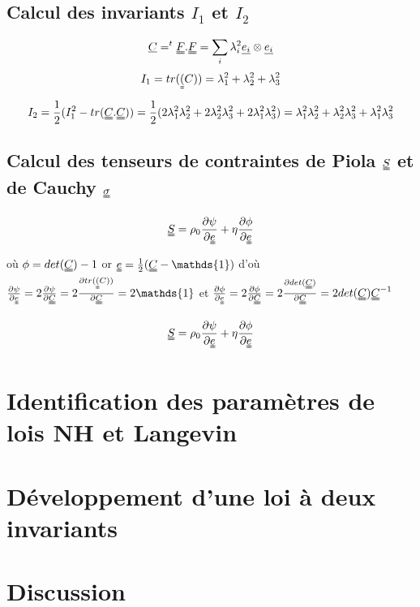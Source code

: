 \documentclass[a4paper,11pt]{article}
\begin{document}
\subsection*{Calcul des invariants $I_1$ et $I_2$}
$$\uline{C}=^t\uuline{F}.\uuline{F}=\sum_{i} \lambda_i ^2\uline{e_i}\otimes \uline{e_i}$$
$$I_1= tr(\uuline(C))=\lambda_1^2+\lambda_2^2+\lambda_3^2$$
$$I_2=\frac{1}{2}(I_1^2 - tr(\uuline{C}.\uuline{C})) =\frac{1}{2}(2\lambda_1^2\lambda_2^2+2\lambda_2^2\lambda_3^2+2\lambda_1^2\lambda_3^2) =\lambda_1^2\lambda_2^2+\lambda_2^2\lambda_3^2+\lambda_1^2\lambda_3^2  $$

\subsection*{Calcul des tenseurs de contraintes de Piola $\uuline{S}$ et de Cauchy $\uuline{\sigma}$}
$$ \uuline{S} = \rho_0 \frac{\partial \psi}{\partial \uuline{e}} + \eta\frac{\partial \phi}{\partial \uuline{e}} $$ où $\phi= det(\uuline{C})-1 $
or $\uuline{e}=\frac{1}{2}(\uuline{C}-\mathds{1})$ d'où $\frac{\partial \psi}{\partial \uuline{e}} =2 \frac{\partial \psi}{\partial \uuline{C}} = 2 \frac{\partial tr(\uuline(C))}{\partial \uuline{C}} = 2 \mathds{1}$
et $\frac{\partial \phi}{\partial \uuline{e}} = 2 \frac{\partial \phi}{\partial \uuline{C}}= 2 \frac{\partial det(\uuline{C})}{\partial \uuline{C}}= 2 det(\uuline{C}) \uuline{C}^{-1}$

$$\uuline{S} = \rho_0 \frac{\partial \psi}{\partial \uuline{e}} + \eta\frac{\partial \phi}{\partial \uuline{e}} $$



\section{Identification des paramètres de lois NH et Langevin}




\section{Développement d'une loi à deux invariants}




\section{Discussion}
\end{document}
